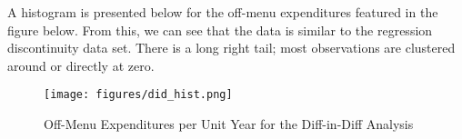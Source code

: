 A histogram is presented below for the off-menu expenditures featured in the figure below. 
From this, we can see that the data is similar to the regression discontinuity data set. 
There is a long right tail; most observations are clustered around or directly at zero. 

\begin{figure}[H]
    \centering
    \texttt{[image: figures/did\_hist.png]}
    \caption{Off-Menu Expenditures per Unit Year for the Diff-in-Diff Analysis}
    \label{fig:my_label}
\end{figure}

